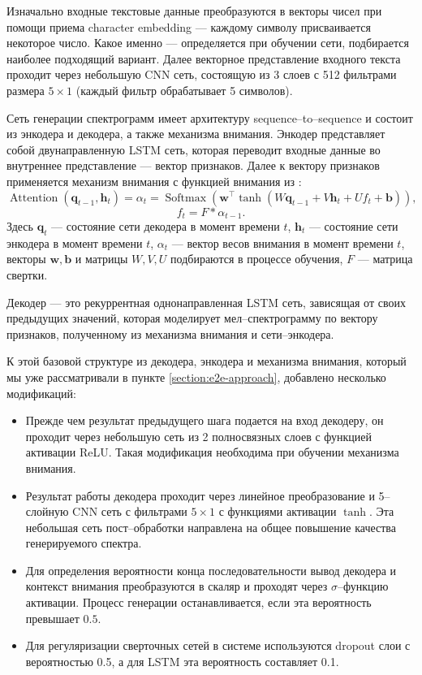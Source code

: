 Изначально входные текстовые данные преобразуются в векторы чисел при помощи приема character embedding --- каждому символу присваивается некоторое число. Какое именно --- определяется при обучении сети, подбирается наиболее подходящий вариант. Далее векторное представление входного текста проходит через небольшую CNN сеть, состоящую из 3 слоев с 512 фильтрами размера $5 \times 1$ (каждый фильтр обрабатывает 5 символов).

Сеть генерации спектрограмм имеет архитектуру sequence--to--sequence и состоит из энкодера и декодера, а также механизма внимания. Энкодер представляет собой двунаправленную LSTM сеть\cite{huang2015bidirectional}, которая переводит входные данные во внутреннее представление --- вектор признаков. Далее к вектору признаков применяется механизм внимания с функцией внимания из \cite{chorowski2015attention}:
$$\operatorname{Attention}(\mathbf{q}_{t - 1}, \mathbf{h}_t) = \alpha_t = \operatorname{Softmax}(\mathbf{w}^\top \tanh (W\mathbf{q}_{t - 1} + V\mathbf{h}_t + Uf_t + \mathbf{b})),$$
$$f_t = F \ast \alpha_{t - 1}.$$
Здесь $\mathbf{q}_t$ --- состояние сети декодера в момент времени $t$, $\mathbf{h}_t$ --- состояние сети энкодера в момент времени $t$, $\alpha_t$ --- вектор весов внимания в момент времени $t$, векторы $\mathbf{w}, \mathbf{b}$ и матрицы $W, V, U$ подбираются в процессе обучения, $F$ --- матрица свертки.

Декодер --- это рекуррентная однонаправленная LSTM сеть, зависящая от своих предыдущих значений, которая моделирует мел--спектрограмму по вектору признаков, полученному из механизма внимания и сети--энкодера.

К этой базовой структуре из декодера, энкодера и механизма внимания, который мы уже рассматривали в пункте \ref{section:e2e-approach}, добавлено несколько модификаций:
\begin{itemize}
	\item Прежде чем результат предыдущего шага подается на вход декодеру, он проходит через небольшую сеть из 2 полносвязных слоев с функцией активации ReLU. Такая модификация необходима при обучении механизма внимания.
	\item Результат работы декодера проходит через линейное преобразование и 5--слойную CNN сеть с фильтрами $5 \times 1$ с функциями активации $\tanh$. Эта небольшая сеть пост--обработки направлена на общее повышение качества генерируемого спектра.
	\item Для определения вероятности конца последовательности вывод декодера и контекст внимания преобразуются в скаляр и проходят через $\sigma$--функцию активации. Процесс генерации останавливается, если эта вероятность превышает $0.5$.
	\item Для регуляризации сверточных сетей в системе используются dropout слои с вероятностью 0.5, а для LSTM эта вероятность составляет 0.1.
\end{itemize}

